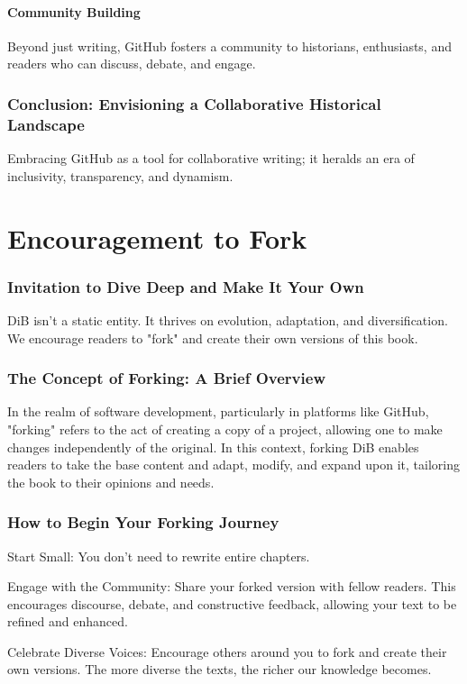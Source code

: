 \documentclass{book}
\begin{document}
\subsubsection*{Community Building}
Beyond just writing, GitHub fosters a community to historians, enthusiasts, and readers who can discuss, debate, and engage.

\subsection*{Conclusion: Envisioning a Collaborative Historical Landscape}
Embracing GitHub as a tool for collaborative writing; it heralds an era of inclusivity, transparency, and dynamism. 

\chapter{Encouragement to Fork}
\subsection*{Invitation to Dive Deep and Make It Your Own}
DiB isn't a static entity. It thrives on evolution, adaptation, and diversification. We encourage readers to "fork" and create their own versions of this book. 

\subsection*{The Concept of Forking: A Brief Overview}

In the realm of software development, particularly in platforms like GitHub, "forking" refers to the act of creating a copy of a project, allowing one to make changes independently of the original. In this context, forking DiB enables readers to take the base content and adapt, modify, and expand upon it, tailoring the book to their opinions and needs.

\subsection*{How to Begin Your Forking Journey}

Start Small: You don't need to rewrite entire chapters. 

Engage with the Community: Share your forked version with fellow readers. This encourages discourse, debate, and constructive feedback, allowing your text to be refined and enhanced.

Celebrate Diverse Voices: Encourage others around you to fork and create their own versions. The more diverse the texts, the richer our knowledge becomes.
\end{document}
